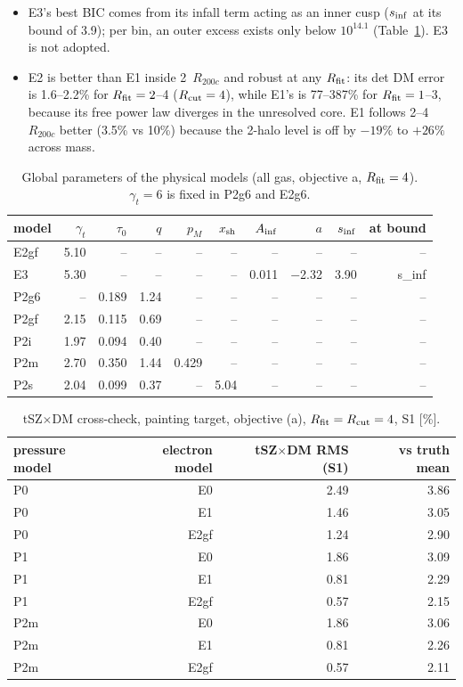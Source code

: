 \documentclass[10pt,a4paper]{article}
\newcommand{\Rc}{R_{200c}}
\newcommand{\Rfit}{R_{\rm fit}}
\newcommand{\Rcut}{R_{\rm cut}}
\begin{document}
\begin{itemize}
\item E3's best BIC comes from its infall term acting as an inner cusp ($s_{\rm inf}$ at its bound of 3.9); per bin, an
  outer excess exists only below $10^{14.1}$ (Table~\ref{tab:globals}). E3 is not adopted.
\item E2 is better than E1 inside 2~$\Rc$ and robust at any $\Rfit$: its det DM error is 1.6--2.2\% for $\Rfit=2$--4
  ($\Rcut=4$), while E1's is 77--387\% for $\Rfit=1$--3, because its free power law diverges in the unresolved core. E1
  follows 2--4~$\Rc$ better (3.5\% vs 10\%) because the 2-halo level is off by $-19\%$ to $+26\%$ across mass.
\end{itemize}

\begin{table}[H]
\centering
\footnotesize
\caption{Global parameters of the physical models (all gas, objective a, $R_{\rm fit}=4$). $\gamma_t=6$ is fixed in P2g6 and E2g6.}
\label{tab:globals}
\begin{tabular}{lrrrrrrrrr}
\toprule
model & $\gamma_t$ & $\tau_0$ & $q$ & $p_M$ & $x_{\rm sh}$ & $A_{\rm inf}$ & $a$ & $s_{\rm inf}$ & at bound \\
\midrule
E2gf & 5.10 & -- & -- & -- & -- & -- & -- & -- & -- \\
E3 & 5.30 & -- & -- & -- & -- & 0.011 & $-$2.32 & 3.90 & s\_inf \\
P2g6 & -- & 0.189 & 1.24 & -- & -- & -- & -- & -- & -- \\
P2gf & 2.15 & 0.115 & 0.69 & -- & -- & -- & -- & -- & -- \\
P2i & 1.97 & 0.094 & 0.40 & -- & -- & -- & -- & -- & -- \\
P2m & 2.70 & 0.350 & 1.44 & 0.429 & -- & -- & -- & -- & -- \\
P2s & 2.04 & 0.099 & 0.37 & -- & 5.04 & -- & -- & -- & -- \\
\bottomrule
\end{tabular}
\end{table}
\begin{table}[H]
\centering
\footnotesize
\caption{tSZ$\times$DM cross-check, painting target, objective (a), $R_{\rm fit}=R_{\rm cut}=4$, S1 [\%].}
\label{tab:cross}
\begin{tabular}{lrrr}
\toprule
pressure model & electron model & tSZ$\times$DM RMS (S1) & vs truth mean \\
\midrule
P0 & E0 & 2.49 & 3.86 \\
P0 & E1 & 1.46 & 3.05 \\
P0 & E2gf & 1.24 & 2.90 \\
P1 & E0 & 1.86 & 3.09 \\
P1 & E1 & 0.81 & 2.29 \\
P1 & E2gf & 0.57 & 2.15 \\
P2m & E0 & 1.86 & 3.06 \\
P2m & E1 & 0.81 & 2.26 \\
P2m & E2gf & 0.57 & 2.11 \\
\bottomrule
\end{tabular}
\end{table}
\end{document}
